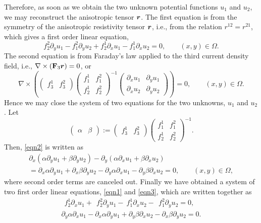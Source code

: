 \documentclass[11pt]{amsart}
\theoremstyle{plain}
\numberwithin{equation}{section}
\numberwithin{Thm}{section}
\def\F{{\bf F}}
\def\r{{\bf r}}
\def\ds{\displaystyle}
\def\r{\mbox{\boldmath$r$}}
\begin{document}
Therefore, as soon as we obtain the two unknown potential functions $u_1$ and $u_2$, we may reconstruct the anisotropic tensor $\r$. The first equation is from the symmetry of the anisotropic resistivity tensor $\r$, i.e., from the relation $r^{12}=r^{21}$, which gives a first order linear equation,
\begin{equation}\label{eqn1}
 f_2^2\partial_yu_1 -f_1^2\partial_yu_2+ f_2^1\partial_xu_1-f_1^1\partial_xu_2 =0,\qquad (x,y)\in\Omega.
\end{equation}
The second equation is from Faraday's law applied to the third current density field, i.e., $\nabla\times(\F_3\r)=0$, or
\begin{equation}\label{eqn2}
\nabla\times\left(
\begin{pmatrix} f^1_3 & f^2_3 \end{pmatrix}\begin{pmatrix} f^1_1 & f^2_1 \\ f^1_2 &f^2_2  \end{pmatrix}^{-1}
\begin{pmatrix} \partial_x u_1 & \partial_y u_1\\ \partial_x u_2 & \partial_y u_2\end{pmatrix}
\right)=0,\qquad (x,y)\in\Omega.
\end{equation}
Hence we may close the system of two equations for the two unknowns, $u_1$ and $u_2$. Let
$$
\begin{pmatrix} \alpha & \beta \end{pmatrix}:=\begin{pmatrix} f^1_3 & f^2_3 \end{pmatrix}\begin{pmatrix} f^1_1 & f^2_1 \\ f^1_2 &f^2_2  \end{pmatrix}^{-1}.
$$
Then, \eqref{eqn2} is written as
\begin{equation}\label{eqn3}
\begin{array}{l}
\partial_x(\alpha\partial_yu_1+\beta\partial_yu_2) -\partial_y(\alpha\partial_xu_1+\beta\partial_xu_2) \\
=\partial_x\alpha\partial_yu_1+\partial_x\beta\partial_yu_2 -\partial_y\alpha\partial_xu_1-\partial_y\beta\partial_xu_2=0,\qquad (x,y)\in\Omega,
\end{array}
\end{equation}
where second order terms are canceled out. Finally we have obtained a system of two first order linear equations, \eqref{eqn1} and \eqref{eqn3}, which are written together as
\begin{equation}\label{system}
\begin{array}{r}\ds
\ \ f_2^1\partial_xu_1+\ \ f_2^2\partial_yu_1-\ f_1^1\partial_xu_2 -\ \ f_1^2\partial_yu_2 =0,\\
\ds
\partial_y\alpha\partial_xu_1 -\partial_x\alpha\partial_yu_1 +\partial_y\beta\partial_xu_2-\partial_x\beta\partial_yu_2 =0.
\end{array}
\end{equation}
\end{document}
